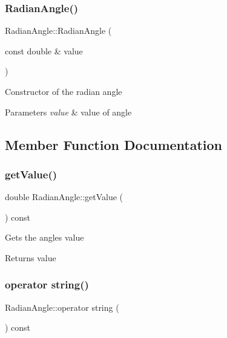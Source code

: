 \subsubsection{\texorpdfstring{Radian\+Angle()}{RadianAngle()}}
{\footnotesize\ttfamily Radian\+Angle\+::\+Radian\+Angle (\begin{DoxyParamCaption}\item[{const double \&}]{value }\end{DoxyParamCaption})}

Constructor of the radian angle 
\begin{DoxyParams}{Parameters}
{\em value} & value of angle \\
\hline
\end{DoxyParams}


\subsection{Member Function Documentation}
\hypertarget{class_radian_angle_af1bf21127c667a74076eab163613e978}{}\label{class_radian_angle_af1bf21127c667a74076eab163613e978} 
\subsubsection{\texorpdfstring{get\+Value()}{getValue()}}
{\footnotesize\ttfamily double Radian\+Angle\+::get\+Value (\begin{DoxyParamCaption}{ }\end{DoxyParamCaption}) const}

Gets the angle\textquotesingle{}s value \begin{DoxyReturn}{Returns}
value 
\end{DoxyReturn}
\hypertarget{class_radian_angle_a19ff772a77d9c531b284894593a3bad3}{}\label{class_radian_angle_a19ff772a77d9c531b284894593a3bad3} 
\subsubsection{\texorpdfstring{operator string()}{operator string()}}
{\footnotesize\ttfamily Radian\+Angle\+::operator string (\begin{DoxyParamCaption}{ }\end{DoxyParamCaption}) const}

